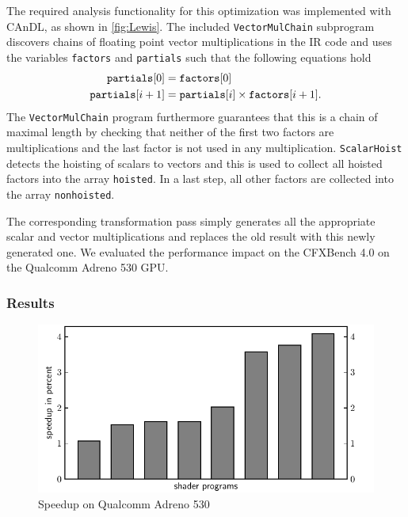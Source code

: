     The required analysis functionality for this optimization was implemented
    with CAnDL, as shown in \autoref{fig:Lewis}.
    The \mbox{included} \texttt{VectorMulChain} subprogram discovers chains of
    floating point vector multiplications in the IR code and uses the variables
    \texttt{factors} and \texttt{partials} such that the following equations
    hold
    \begin{align*}
        \text{\tt partials}[0] &= \text{\tt factors}[0]\\
        \text{\tt partials}[i+1] &= \text{\tt partials}[i]\times\text{\tt factors}[i+1].
    \end{align*}
    The \texttt{VectorMulChain} program furthermore guarantees that this is a
    chain of maximal length by checking that neither of the first two factors
    are multiplications and the last factor is not used in any multiplication.
    \texttt{ScalarHoist} detects the hoisting of scalars to vectors and this is
    used to collect all hoisted factors into the array \texttt{hoisted}.
    In a last step, all other factors are collected into the array
    \texttt{nonhoisted}.

    The corresponding transformation pass simply generates all the appropriate
    scalar and vector multiplications and replaces the old result with this
    newly generated one.
    We evaluated the performance impact on the CFXBench 4.0 on the  Qualcomm
    Adreno 530 GPU.

\subsubsection{Results}

\begin{figure}[t]
\centering
\includegraphics[width=\linewidth]{figures/qualcomm_plot.pdf}
\caption{Speedup on Qualcomm Adreno 530}
\label{fig:qualcommspeedup}
\end{figure}

